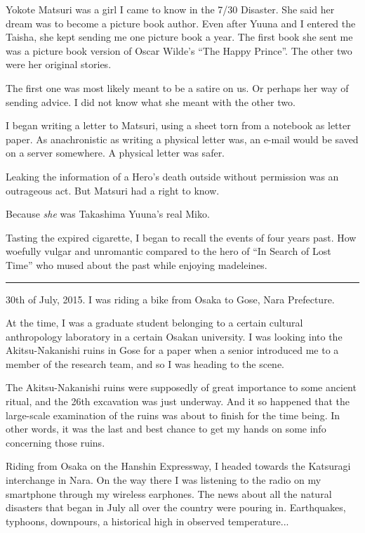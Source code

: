 Yokote Matsuri was a girl I came to know in the 7/30 Disaster. She said her dream was to become a picture book author.  Even after Yuuna and I entered the Taisha, she kept sending me one picture book a year. The first book she sent me was a picture book version of Oscar Wilde's ``The Happy Prince''. The other two were her original stories.

The first one was most likely meant to be a satire on us. Or perhaps her way of sending advice. I did not know what she meant with the other two.

I began writing a letter to Matsuri, using a sheet torn from a notebook as letter paper. As anachronistic as writing a physical letter was, an e-mail would be saved on a server somewhere. A physical letter was safer.

Leaking the information of a Hero's death outside without permission was an outrageous act. But Matsuri had a right to know.

Because \textit{she} was Takashima Yuuna's real Miko.

Tasting the expired cigarette, I began to recall the events of four years past. How woefully vulgar and unromantic compared to the hero of ``In Search of Lost Time'' who mused about the past while enjoying madeleines.

\vspace{\baselineskip}
\hrule
\vspace{\baselineskip}

30th of July, 2015. I was riding a bike from Osaka to Gose, Nara Prefecture.

At the time, I was a graduate student belonging to a certain cultural anthropology laboratory in a certain Osakan university. I was looking into the Akitsu-Nakanishi ruins in Gose for a paper when a senior introduced me to a member of the research team, and so I was heading to the scene.

The Akitsu-Nakanishi ruins were supposedly of great importance to some ancient ritual, and the 26th excavation was just underway. And it so happened that the large-scale examination of the ruins was about to finish for the time being. In other words, it was the last and best chance to get my hands on some info concerning those ruins.

Riding from Osaka on the Hanshin Expressway, I headed towards the Katsuragi interchange in Nara. On the way there I was listening to the radio on my smartphone through my wireless earphones. The news about all the natural disasters that began in July all over the country were pouring in. Earthquakes, typhoons, downpours, a historical high in observed temperature...

